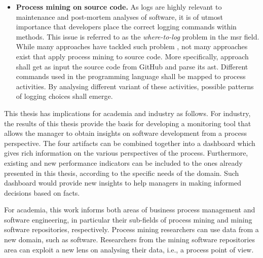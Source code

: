 \begin{itemize}
	\item{\bfseries Process mining on source code.}
	As logs are highly relevant to maintenance and post-mortem analyses of software, it is of utmost importance that developers place the correct logging commands within methods. This issue is referred to as the  \emph{where-to-log} problem in the \gls{msr} field.  While many approaches have tackled such problem \citep{DBLP:conf/icse/FuZHLDLZX14,DBLP:conf/icse/ChenJ17,DBLP:conf/msr/CandidoHAD21}, not many approaches exist that apply process mining to source code. More specifically, approach shall get as input the source code from GitHub and parse its \gls{ast}. Different commands used in the programming language shall be mapped to process activities. By analysing different variant of these activities, possible patterns of logging choices shall emerge. 
	
	
\end{itemize}

This thesis has implications for academia and industry as follows. 
For industry, the results of this thesis provide the basis for developing a monitoring tool that allows the manager to obtain insights on software development from a process perspective. The four artifacts can be combined together into a dashboard which gives rich information on the various perspectives of the process. Furthermore, existing and new performance indicators can be included to the ones already presented in this thesis, according to the specific needs of the domain. Such dashboard would provide new insights to help managers in making informed decisions based on facts. 

For academia, this work informs both areas of business process management and software engineering, in particular their sub-fields of process mining and mining software repositories, respectively. Process mining researchers can use data from a new domain, such as software. Researchers from the mining software repositories area can exploit a new lens on analysing their data, i.e., a process point of view. 

